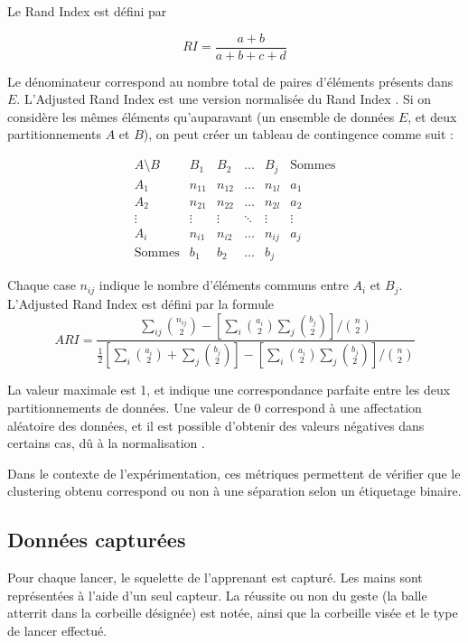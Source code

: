 Le Rand Index est défini par

\[ RI = \frac{a+b}{a+b+c+d} \]

Le dénominateur correspond au nombre total de paires d'éléments présents dans $E$. L'Adjusted Rand Index est une version normalisée du Rand Index \parencite{Hubert1985Cp}. Si on considère les mêmes éléments qu'auparavant (un ensemble de données $E$, et deux partitionnements $A$ et $B$), on peut créer un tableau de contingence comme suit :

\[
\begin{array}{c|cccc|c}
A \setminus B&B_{1}&B_{2}&\ldots &B_{j}&{\text{Sommes}}\\\hline
A_{1}&n_{11}&n_{12}&\ldots &n_{1l}&a_{1}\\
A_{2}&n_{21}&n_{22}&\ldots &n_{2l}&a_{2}\\
\vdots &\vdots &\vdots &\ddots &\vdots &\vdots \\
A_{i}&n_{i1}&n_{i2}&\ldots &n_{ij}&a_{j}\\\hline
{\text{Sommes}}&b_{1}&b_{2}&\ldots &b_{j}&
\end{array}
\]

Chaque case $n_{ij}$ indique le nombre d'éléments communs entre $A_i$ et $B_j$. L'Adjusted Rand Index est défini par la formule
\[ARI={\frac {\sum _{ij}{\binom {n_{ij}}{2}}-[\sum _{i}{\binom {a_{i}}{2}}\sum _{j}{\binom {b_{j}}{2}}]/{\binom {n}{2}}}{{\frac {1}{2}}[\sum _{i}{\binom {a_{i}}{2}}+\sum _{j}{\binom {b_{j}}{2}}]-[\sum _{i}{\binom {a_{i}}{2}}\sum _{j}{\binom {b_{j}}{2}}]/{\binom {n}{2}}}}\]

La valeur maximale est 1, et indique une correspondance parfaite entre les deux partitionnements de données. Une valeur de 0 correspond à une affectation aléatoire des données, et il est possible d'obtenir des valeurs négatives dans certains cas, dû à la normalisation \parencite{Meila2007Cca}.

Dans le contexte de l'expérimentation, ces métriques permettent de vérifier que le clustering obtenu correspond ou non à une séparation selon un étiquetage binaire.

\subsection{Données capturées}
Pour chaque lancer, le squelette de l'apprenant est capturé. Les mains sont représentées à l'aide d'un seul capteur. La réussite ou non du geste (la balle atterrit dans la corbeille désignée) est notée, ainsi que la corbeille visée et le type de lancer effectué.

